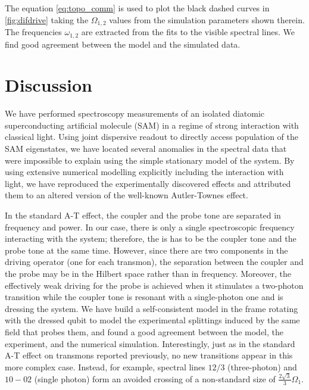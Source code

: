 \documentclass[%
 pra,
 amsmath,amssymb,
 reprint,%
]{revtex4-1}
\begin{document}
The equation \eqref{eq:topo_comm} is used to plot the black dashed curves in \autoref{fig:difdrive} taking the $\Omega_{1,2}$ values from the simulation parameters shown therein. The frequencies $\omega_{1,2}$ are extracted from the fits to the visible spectral lines. We find good agreement between the model and the simulated data.


\section{Discussion}

We have performed spectroscopy measurements of an isolated diatomic superconducting artificial molecule (SAM) in a regime of strong interaction with classical light. Using joint dispersive readout to directly access population of the SAM eigenstates, we have located several anomalies in the spectral data that were impossible to explain using the simple stationary model of the system. By using extensive numerical modelling explicitly including the interaction with light, we have reproduced the experimentally discovered effects and attributed them to an altered version of the well-known Autler-Townes effect.

In the standard A-T effect, the coupler and the probe tone are separated in frequency and power. In our case, there is only a single spectroscopic frequency interacting with the system; therefore, the is has to be the coupler tone and the probe tone at the same time. However, since there are two components in the driving operator (one for each transmon), the separation between the coupler and the probe may be in the Hilbert space rather than in frequency. Moreover, the effectively weak driving for the probe is achieved when it stimulates a two-photon transition while the coupler tone is resonant with a single-photon one and is dressing the system. We have build a self-consistent model in the frame rotating with the dressed qubit to model the experimental splittings induced by the same field that probes them, and found a good agreement between the model, the experiment, and the numerical simulation. Interestingly, just as in the standard A-T effect on transmons reported previously, no new transitions appear in this more complex case. Instead, for example, spectral lines $12/3$ (three-photon) and $10-02$ (single photon) form an avoided crossing of a non-standard size of $\frac{2\sqrt{3}}{3} \Omega_1$.
\end{document}
